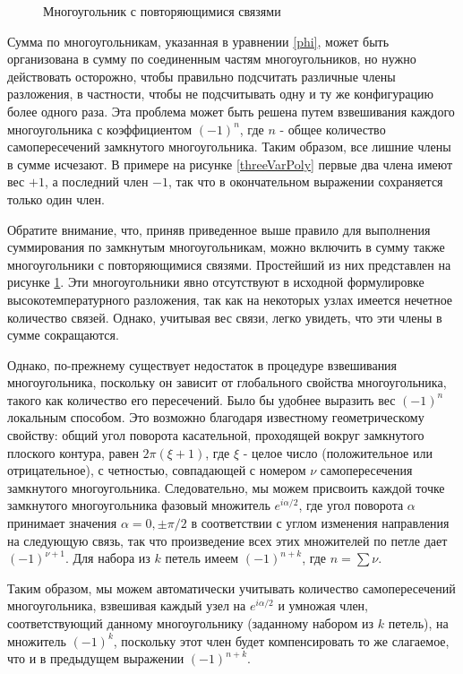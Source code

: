  \begin{figure}[h]
 	\caption{Многоугольник с повторяющимися связями}
 	\label{PolyRepeatBonds}
 \end{figure}

Сумма по многоугольникам, указанная в уравнении \eqref{phi}, может быть организована в сумму по соединенным частям многоугольников, но нужно действовать осторожно, чтобы правильно подсчитать различные члены разложения, в частности, чтобы не подсчитывать одну и ту же конфигурацию более одного раза. Эта проблема может быть решена путем взвешивания каждого многоугольника с коэффициентом $(-1)^n$, где $n$ - общее количество самопересечений замкнутого многоугольника. Таким образом, все лишние члены в сумме исчезают. В примере на рисунке \ref{threeVarPoly} первые два члена имеют вес $+1$, а последний член $-1$, так что в окончательном выражении сохраняется только один член.

Обратите внимание, что, приняв приведенное выше правило для выполнения суммирования по замкнутым многоугольникам, можно включить в сумму также многоугольники с повторяющимися связями. Простейший из них представлен на рисунке \ref{PolyRepeatBonds}. Эти многоугольники явно отсутствуют в исходной формулировке высокотемпературного разложения, так как на некоторых узлах имеется нечетное количество связей. Однако, учитывая вес связи, легко увидеть, что эти члены в сумме сокращаются.

Однако, по-прежнему существует недостаток в процедуре взвешивания многоугольника, поскольку он зависит от глобального свойства многоугольника, такого как количество его пересечений. Было бы удобнее выразить вес $(−1)^n$ локальным способом. Это возможно благодаря известному геометрическому свойству: общий угол поворота касательной, проходящей вокруг замкнутого плоского контура, равен $2\pi (\xi + 1)$, где $\xi$ - целое число (положительное или отрицательное), с четностью, совпадающей с номером $\nu$ самопересечения замкнутого многоугольника. Следовательно, мы можем присвоить каждой точке замкнутого многоугольника фазовый множитель $e^{i\alpha / 2}$, где угол поворота $\alpha$ принимает значения $\alpha = 0, \pm \pi/ 2$ в соответствии с углом изменения направления на следующую связь, так что произведение всех этих множителей по петле дает $(−1)^{\nu + 1}$. Для набора из $k$ петель имеем $(−1)^{n + k}$, где $n = \sum \nu$.

Таким образом, мы можем автоматически учитывать количество самопересечений многоугольника, взвешивая каждый узел на $e^{i\alpha/2}$ и умножая член, соответствующий данному многоугольнику (заданному набором из $k$ петель), на множитель $(−1)^k$, поскольку этот член будет компенсировать то же слагаемое, что и в предыдущем выражении $(-1)^{n + k}$.


